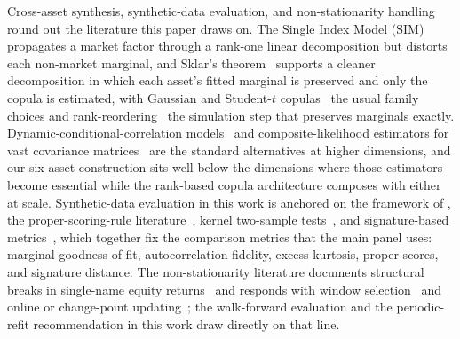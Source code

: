 Cross-asset synthesis, synthetic-data evaluation, and non-stationarity handling round out the literature this paper draws on. The Single Index Model (SIM)~\cite{sharpe1963simplified} propagates a market factor through a rank-one linear decomposition but distorts each non-market marginal, and Sklar's theorem~\cite{sklar1959fonctions, nelsen2006introduction} supports a cleaner decomposition in which each asset's fitted marginal is preserved and only the copula is estimated, with Gaussian and Student-$t$ copulas~\cite{demarta2005tcopula, mcneil2015quantitative} the usual family choices and rank-reordering~\cite{iman1982distribution} the simulation step that preserves marginals exactly. Dynamic-conditional-correlation models~\cite{engle2002dynamic} and composite-likelihood estimators for vast covariance matrices~\cite{pakel2021fitting} are the standard alternatives at higher dimensions, and our six-asset construction sits well below the dimensions where those estimators become essential while the rank-based copula architecture composes with either at scale. Synthetic-data evaluation in this work is anchored on the framework of \citet{stenger2024thinking}, the proper-scoring-rule literature~\cite{gneiting2007strictly, gneiting2014probabilistic, diebold1995comparing}, kernel two-sample tests~\cite{gretton2012kernel}, and signature-based metrics~\cite{chevyrev2016primer, ni2020conditional}, which together fix the comparison metrics that the main panel uses: marginal goodness-of-fit, autocorrelation fidelity, excess kurtosis, proper scores, and signature distance. The non-stationarity literature documents structural breaks in single-name equity returns~\cite{pastorstambaugh2001equity, andreoughysels2002breaks, angtimmermann2012regime} and responds with window selection~\cite{pesarantimmermann2007window} and online or change-point updating~\cite{cappe2011online, adams2007bayesian, fearnhead2007online}; the walk-forward evaluation and the periodic-refit recommendation in this work draw directly on that line.
